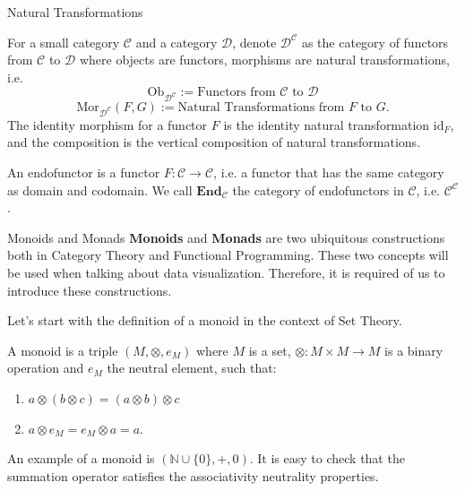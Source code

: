 \documentclass[aspectratio=169,xcolor=dvipsnames,10pt]{beamer}
\theoremstyle{definition}
\begin{document}
\begin{frame}[fragile]{Natural Transformations}
    \begin{definition}
        For a small category $\mathcal C$ and a category $\mathcal D$,
        denote $\mathcal D^{\mathcal C}$ as the category of functors
        from $\mathcal C$ to $\mathcal D$ where objects are functors, morphisms are natural transformations,
        i.e.
        \begin{displaymath}
            \text{Ob}_{\mathcal D^{\mathcal C}} :={\text{Functors from } \mathcal C \text{ to } \mathcal D}
        \end{displaymath}
        \begin{displaymath}
            \text{Mor}_{\mathcal D^{\mathcal C}}(F,G) :={\text{Natural Transformations from }
            F \text{ to } G}.
        \end{displaymath}
        The identity morphism for a functor $F$ is the identity natural transformation $\text{id}_F$,
        and the composition is the vertical composition of natural transformations.
    \end{definition}
    An endofunctor is a functor $F:\mathcal C \to \mathcal C$, i.e. a functor that
    has the same category as domain and codomain. We call $\mathbf{End}_\mathcal C$ the
    category of endofunctors in $\mathcal C$, i.e. $\mathcal C^\mathcal C$.
\end{frame}

\begin{frame}[fragile]{Monoids and Monads}
	\textbf{Monoids} and \textbf{Monads} are two ubiquitous constructions both in Category Theory and
	Functional Programming. These two concepts will be used when talking about
	data visualization. Therefore, it is required of us to introduce these constructions.

	Let's start with the definition of a monoid in the context of Set Theory.

	\begin{definition}
		A monoid is a triple $(M, \otimes, e_M)$ where $M$ is a set, $\otimes:M\times M \to M$ is a binary operation
		and $e_M$ the neutral element, such that:
		\begin{enumerate}
			\item $a \otimes (b \otimes c) = (a \otimes b) \otimes c$
			\item $a \otimes e_M = e_M \otimes a = a$.
		\end{enumerate}
		\label{def:monoid}
	\end{definition}

	An example of a monoid is $(\mathbb N \cup \{0\}, +, 0)$.
	It is easy to check that the summation operator satisfies the
	associativity neutrality properties.
\end{frame}
\end{document}
